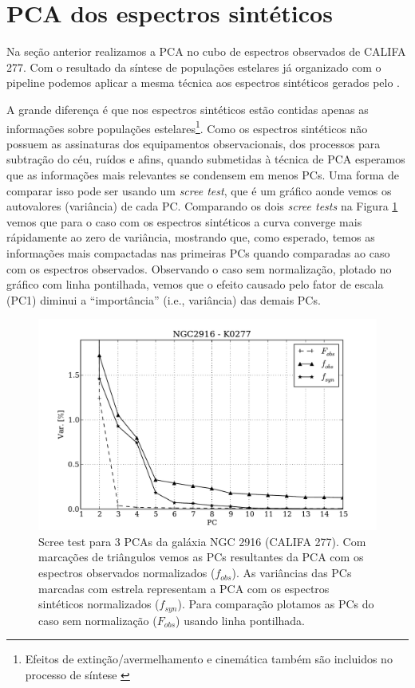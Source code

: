 \section{PCA dos espectros sintéticos}
\label{sec:PCAaplic:OBSxSYN}

Na seção anterior realizamos a PCA no cubo de espectros observados de CALIFA 277. Com o resultado da síntese de
populações estelares já organizado com o pipeline \pycasso podemos aplicar a mesma técnica aos espectros sintéticos
gerados pelo \starlight.

A grande diferença é que nos espectros sintéticos estão contidas apenas as informações sobre populações
estelares\footnote{Efeitos de extinção/avermelhamento e cinemática também são incluidos no processo de síntese
\citep{CidFernandes2005}}. Como os espectros sintéticos não possuem as assinaturas dos equipamentos observacionais, dos
processos para subtração do céu, ruídos e afins, quando submetidas à técnica de PCA esperamos que as informações mais
relevantes se condensem em menos PCs. Uma forma de comparar isso pode ser usando um {\em scree test}, que é um gráfico
aonde vemos os autovalores (variância) de cada PC. Comparando os dois {\em scree tests} na Figura \ref{fig:K0277scree}
vemos que para o caso com os espectros sintéticos a curva converge mais rápidamente ao zero de variância, mostrando que,
como esperado, temos as informações mais compactadas nas primeiras PCs quando comparadas ao caso com os espectros
observados. Observando o caso sem normalização, plotado no gráfico com linha pontilhada, vemos que o efeito causado pelo
fator de escala (PC1) diminui a ``importância'' (i.e., variância) das demais PCs.

\begin{figure}
    \includegraphics[width=1.\textwidth]{figuras/K0277-screetest.pdf}
    \caption[Scree test comparativo entre 3 PCAs.]
    {Scree test para 3 PCAs da galáxia NGC 2916 (CALIFA 277). Com marcações de triângulos vemos as PCs resultantes
    da PCA com os espectros observados normalizados ($f_{obs}$). As variâncias das PCs marcadas com estrela
    representam a PCA com os espectros sintéticos normalizados ($f_{syn}$). Para comparação plotamos as PCs do
    caso sem normalização ($F_{obs}$) usando linha pontilhada.}
    \label{fig:K0277scree}
\end{figure}

